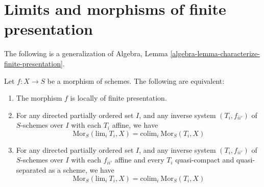 \section{Limits and morphisms of finite presentation}
\label{section-finite-presentation}

\noindent
The following is a generalization of
Algebra, Lemma \ref{algebra-lemma-characterize-finite-presentation}.

\begin{proposition}
\label{proposition-characterize-locally-finite-presentation}
Let $f : X \to S$ be a morphism of schemes.
The following are equivalent:
\begin{enumerate}
\item The morphism $f$ is locally of finite presentation.
\item For any directed partially ordered set $I$, and any
inverse system $(T_i, f_{ii'})$ of $S$-schemes over $I$
with each $T_i$ affine, we have
$$
\text{Mor}_S(\text{lim}_i\ T_i, X) =
\text{colim}_i\ \text{Mor}_S(T_i, X)
$$
\item For any directed partially ordered set $I$, and any
inverse system $(T_i, f_{ii'})$ of $S$-schemes over $I$
with each $f_{ii'}$ affine and every $T_i$ quasi-compact and
quasi-separated as a scheme, we have
$$
\text{Mor}_S(\text{lim}_i\ T_i, X) =
\text{colim}_i\ \text{Mor}_S(T_i, X)
$$
\end{enumerate}
\end{proposition}

